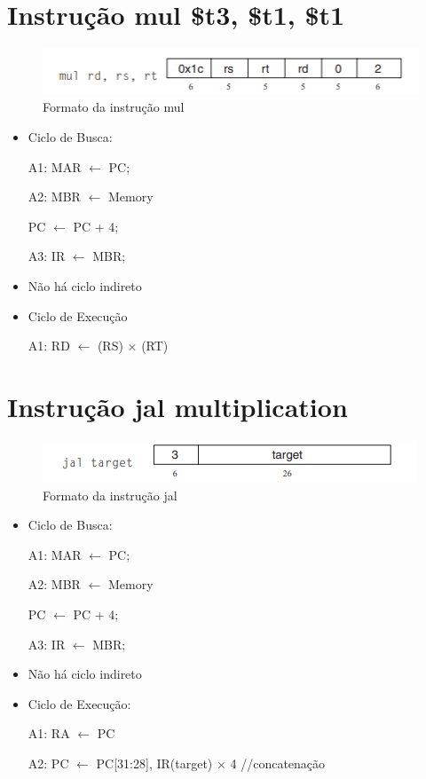 \documentclass[
	12pt,				%
	oneside,			%
	a4paper,			%
	english,			%
	brazil				%
	]{abntex2ppgsi}
\begin{document}
\section{Instrução mul \$t3, \$t1, \$t1}

\begin{figure}[h]
    \centering
    \includegraphics{43.png}
    \caption{Formato da instrução mul}
    \label{fig43}
\end{figure}

\begin{itemize}
    \item Ciclo de Busca:

    A1: MAR $\leftarrow$ PC;
    
    A2: MBR $\leftarrow$ Memory 
       
       PC $\leftarrow$ PC + 4;

    A3: IR $\leftarrow$ MBR;

    \item Não há ciclo indireto

    \item Ciclo de Execução

    A1: RD $\leftarrow$ (RS) $\times$ (RT)
\end{itemize}

\section{Instrução jal multiplication}

\begin{figure}[h]
    \centering
    \includegraphics{44.png}
    \caption{Formato da instrução jal}
    \label{fig44}
\end{figure}

\begin{itemize}
    \item Ciclo de Busca:
    
    A1: MAR $\leftarrow$ PC;

    A2: MBR $\leftarrow$ Memory 
    
       PC $\leftarrow$ PC + 4;

    A3: IR $\leftarrow$ MBR;

    \item Não há ciclo indireto
    \item Ciclo de Execução:
    
    A1: RA $\leftarrow$ PC
    
    A2: PC $\leftarrow$ {PC[31:28], IR(target) $\times$ 4} //concatenação
\end{itemize}
\end{document}

